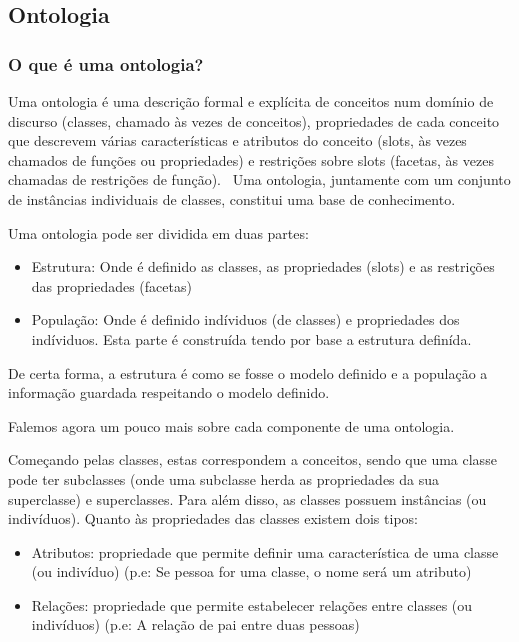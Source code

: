 \subsection{Ontologia}

\subsubsection{O que é uma ontologia?}

Uma ontologia é uma descrição formal e explícita de conceitos num domínio de discurso (classes, chamado às vezes de conceitos), propriedades de cada conceito que descrevem várias características e atributos do conceito (slots, às vezes chamados de funções ou propriedades) e restrições sobre slots (facetas, às vezes chamadas de restrições de função).~\cite{ontologyProt} Uma ontologia, juntamente com um conjunto de instâncias individuais de classes, constitui uma base de conhecimento.~\cite{ontologyProt}

Uma ontologia pode ser dividida em duas partes:
\begin{itemize}
    \item Estrutura: Onde é definido as classes, as propriedades (slots) e as restrições das propriedades (facetas)
    \item População: Onde é definido indíviduos (de classes) e propriedades dos indíviduos. Esta parte é construída tendo por base a estrutura definída.
\end{itemize}
De certa forma, a estrutura é como se fosse o modelo definido e a população a informação guardada respeitando o modelo definido.

Falemos agora um pouco mais sobre cada componente de uma ontologia.

Começando pelas classes, estas correspondem a conceitos, sendo que uma classe pode ter subclasses (onde uma subclasse herda as propriedades da sua superclasse) e superclasses. Para além disso, as classes possuem instâncias (ou indivíduos). Quanto às propriedades das classes existem dois tipos:
\begin{itemize}
    \item Atributos: propriedade que permite definir uma característica de uma classe (ou indivíduo) (p.e: Se pessoa for uma classe, o nome será um atributo)
    \item Relações: propriedade que permite estabelecer relações entre classes (ou indivíduos) (p.e: A relação de pai entre duas pessoas) 
\end{itemize}

